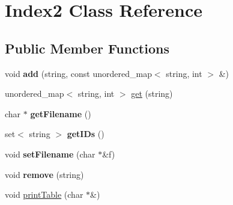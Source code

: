 \hypertarget{class_index2}{\section{Index2 Class Reference}
\label{class_index2}
}
\subsection*{Public Member Functions}
\begin{DoxyCompactItemize}
\item 
\hypertarget{class_index2_ae665a850910df49bcc76844f45acca38}{void {\bfseries add} (string, const unordered\+\_\+map$<$ string, int $>$ \&)}\label{class_index2_ae665a850910df49bcc76844f45acca38}

\item 
unordered\+\_\+map$<$ string, int $>$ \hyperlink{class_index2_a2dc452a2c5fb0cb7b48ffbcd8f009c2f}{get} (string)
\item 
\hypertarget{class_index2_a5f21b524143a41c5bbd9b7ab5397e1dc}{char $\ast$ {\bfseries get\+Filename} ()}\label{class_index2_a5f21b524143a41c5bbd9b7ab5397e1dc}

\item 
\hypertarget{class_index2_a9418695a0ae381db44183472a0c1e45f}{set$<$ string $>$ {\bfseries get\+I\+Ds} ()}\label{class_index2_a9418695a0ae381db44183472a0c1e45f}

\item 
\hypertarget{class_index2_a9ba4a7a5cb05374b6338488776444e6f}{void {\bfseries set\+Filename} (char $\ast$\&f)}\label{class_index2_a9ba4a7a5cb05374b6338488776444e6f}

\item 
\hypertarget{class_index2_a61157fcfb23529c0303e0dd01e9f9d76}{void {\bfseries remove} (string)}\label{class_index2_a61157fcfb23529c0303e0dd01e9f9d76}

\item 
void \hyperlink{class_index2_ae8bc26572fb343b309fd6d010a4ed4ba}{print\+Table} (char $\ast$\&)
\end{DoxyCompactItemize}


